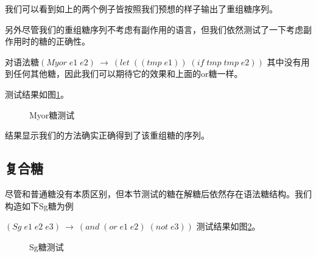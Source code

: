 我们可以看到如上的两个例子皆按照我们预想的样子输出了重组糖序列。

另外尽管我们的重组糖序列不考虑有副作用的语言，但我们依然测试了一下考虑副作用时的糖的正确性。

对语法糖$(Myor\;e1\;e2)~→~(let\;((tmp\;e1))\;(if\;tmp\;tmp\;e2))$
其中没有用到任何其他糖，因此我们可以期待它的效果和上面的or糖一样。

测试结果如图\ref{fig:myor}。
\begin{figure}[ht]
	\begin{center}
	\end{center}
	\caption{Myor糖测试}
	\label{fig:myor}
\end{figure}

结果显示我们的方法确实正确得到了该重组糖的序列。

\subsection{复合糖}

尽管和普通糖没有本质区别，但本节测试的糖在解糖后依然存在语法糖结构。我们构造如下Sg糖为例

$(Sg\;e1\;e2\;e3)~→~(and\;(or\;e1\;e2)\;(not\;e3))$
测试结果如图\ref{fig:sg}。

\begin{figure}[ht]
	\begin{center}
	\end{center}
\caption{Sg糖测试}
\label{fig:sg}
\end{figure}



